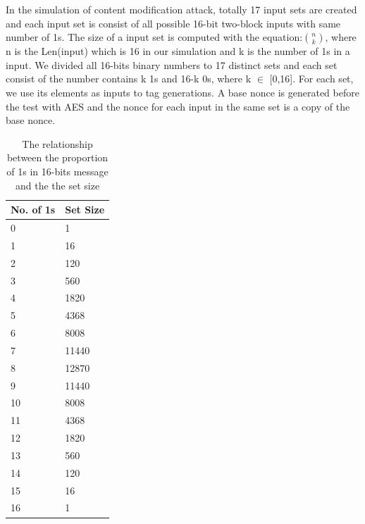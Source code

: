 \documentclass{article}
\begin{document}
In the simulation of content modification attack, totally 17 input sets are created and each input set is consist of all possible 16-bit two-block inputs with same number of 1s. The size of a input set is computed with the equation:$\binom{n}{k}$, where n is the Len(input) which is 16 in our simulation and k is the number of 1s in a input.   
We divided all 16-bits binary numbers to 17 distinct sets and each set consist of the number contains k 1s and 16-k 0s, where k $\in$ [0,16]. For each set, we use its elements as inputs to tag generations. A base nonce is generated before the test with AES and the nonce for each input in the same set is a copy of the base nonce.   
\begin{table}[htbp]
  \centering
  \caption{The relationship between the proportion of 1s in 16-bits message and the the set size}
    \begin{tabular}{ll}
    \toprule
    No. of 1s & Set Size \\
    \midrule
    0     & 1 \\
    1     & 16 \\
    2     & 120 \\
    3     & 560 \\
    4     & 1820 \\
    5     & 4368 \\
    6     & 8008 \\
    7     & 11440 \\
    8     & 12870 \\
    9     & 11440 \\
    10    & 8008 \\
    11    & 4368 \\
    12    & 1820 \\
    13    & 560 \\
    14    & 120 \\
    15    & 16 \\
    16    & 1 \\
    \bottomrule
    \end{tabular}%
  \label{tab:set-size}%
\end{table}%
\end{document}
